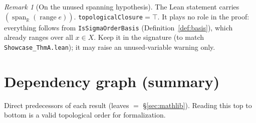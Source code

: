 \documentclass[11pt]{article}
\theoremstyle{definition}
\theoremstyle{plain}
\theoremstyle{remark}
\newtheorem{remark}[definition]{Remark}
\newcommand{\R}{\mathbb{R}}
\begin{document}
\begin{remark}[On the unused spanning hypothesis]\label{rem:hspan}
The Lean statement carries \((\operatorname{span}_\R(\operatorname{range} e))\).
\texttt{topologicalClosure}\(=\top\). It plays no role in the proof: everything
follows from \texttt{IsSigmaOrderBasis} (Definition~\ref{def:basis}), which already
ranges over all \(x\in X\). Keep it in the signature (to match
\texttt{Showcase\_ThmA.lean}); it may raise an unused-variable warning only.
\end{remark}

\section{Dependency graph (summary)}\label{sec:dag}

Direct predecessors of each result (leaves \(=\) \S\ref{sec:mathlib}). Reading this
top to bottom is a valid topological order for formalization.
\end{document}
